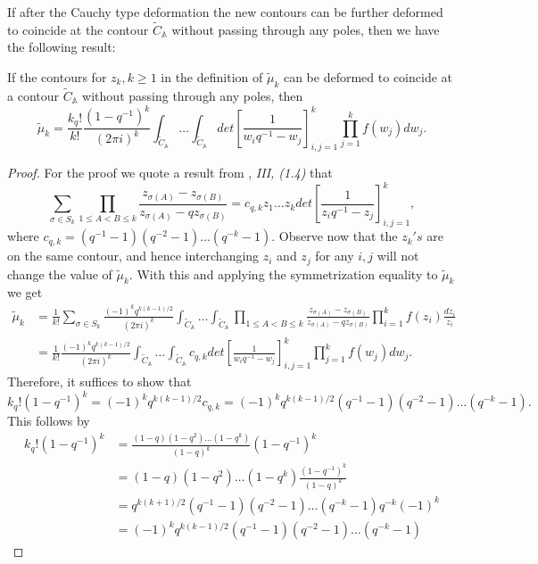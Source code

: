 If after the Cauchy type deformation the new contours can be further deformed to coincide at the contour $\tilde{C}_{\mathbb{A}}$ without passing through any poles, then we have the following result:

\begin{proposition}
\label{cauchy-mu-form}
If the contours for $z_k, k \ge 1$ in the definition of $\tilde{\mu}_k$ can be deformed to coincide at a contour $\tilde{C}_{\mathbb{A}}$ without passing through any poles, then $$\tilde{\mu}_k = \frac{k_q!}{k!} \frac{(1-q^{-1})^k}{(2 \pi i)^k} \int_{\tilde{C}_{\mathbb{A}}} \dots \int_{\tilde{C}_{\mathbb{A}}} det\left[ \frac{1}{w_i q^{-1} - w_j} \right]_{i,j=1}^k \prod_{j=1}^k f(w_j) dw_j.$$
\end{proposition}

\begin{proof}
For the proof we quote a result from \cite{symmetrization}, \textit{III, (1.4)} that $$\sum_{\sigma \in S_k} \prod_{1 \le A < B \le k} \frac{z_{\sigma(A)} - z_{\sigma(B)}}{z_{\sigma(A)} - qz_{\sigma(B)}} = c_{q,k} z_1 \dots z_k det\left[ \frac{1}{z_i q^{-1} - z_j} \right]_{i,j=1}^k,$$ where $c_{q,k} = (q^{-1} - 1) (q^{-2} - 1) \dots (q^{-k} - 1)$. Observe now that the $z_k's$ are on the same contour, and hence interchanging $z_i$ and $z_j$ for any $i, j$ will not change the value of $\tilde{\mu}_k$. With this and applying the symmetrization equality to $\tilde{\mu}_k$ we get 
\begin{align*}
\tilde{\mu}_k &= \frac{1}{k!} \sum_{\sigma \in S_k} \frac{(-1)^k q^{k(k-1)/2}}{(2 \pi i)^k} \int_{\tilde{C}_{\mathbb{A}}} \dots \int_{\tilde{C}_{\mathbb{A}}} \prod_{1 \le A < B \le k} \frac{z_{\sigma(A)} - z_{\sigma(B)}} {z_{\sigma(A)} - qz_{\sigma(B)}} \prod_{i=1}^k f(z_i) \frac{dz_i}{z_i} \\
&= \frac{1}{k!} \frac{(-1)^k q^{k(k-1)/2}}{(2 \pi i)^k} \int_{\tilde{C}_{\mathbb{A}}} \dots \int_{\tilde{C}_{\mathbb{A}}} c_{q,k} det\left[ \frac{1}{w_i q^{-1} - w_j} \right]_{i,j=1}^k \prod_{j=1}^k f(w_j) dw_j.
\end{align*}
Therefore, it suffices to show that $$k_q! (1-q^{-1})^k = (-1)^k q^{k(k-1)/2}  c_{q,k} = (-1)^k q^{k(k-1)/2} (q^{-1} - 1) (q^{-2} - 1) \dots (q^{-k} - 1).$$ This follows by
\begin{align*}
k_q! (1-q^{-1})^k &= \frac{(1-q)(1-q^2) \dots (1-q^k)}{(1-q)^k} (1-q^{-1})^k\\
&= (1-q)(1-q^2) \dots (1-q^k) \frac{(1-q^{-1})^k}{(1-q)^k} \\ 
&= q^{k(k+1)/2} (q^{-1} - 1) (q^{-2} - 1) \dots (q^{-k} - 1) q^{-k} (-1)^k\\
&= (-1)^k q^{k(k-1)/2} (q^{-1} - 1) (q^{-2} - 1) \dots (q^{-k} - 1) 
\end{align*}
\end{proof}

